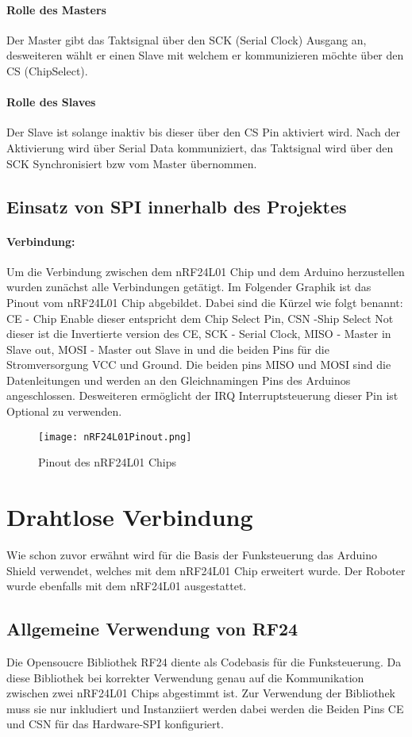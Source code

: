 \documentclass[12pt]{article}
\begin{document}
\paragraph{Rolle des Masters}
Der Master gibt das Taktsignal über den SCK (Serial Clock) Ausgang an, desweiteren wählt er einen Slave mit welchem er kommunizieren möchte über den CS (ChipSelect).
\paragraph{Rolle des Slaves}
Der Slave ist solange inaktiv bis dieser über den CS Pin aktiviert wird. Nach der Aktivierung wird über Serial Data kommuniziert, das Taktsignal wird über den SCK Synchronisiert bzw vom Master übernommen. 

\subsection{Einsatz von SPI innerhalb des Projektes}
\paragraph{Verbindung: }
Um die Verbindung zwischen dem nRF24L01 Chip und dem Arduino herzustellen  wurden zunächst alle Verbindungen getätigt. Im Folgender Graphik ist das Pinout vom nRF24L01 Chip abgebildet. Dabei sind die Kürzel wie folgt benannt: CE - Chip Enable dieser entspricht dem Chip Select Pin, CSN -Ship Select Not dieser ist die Invertierte version des CE, SCK - Serial Clock, MISO - Master in Slave out, MOSI - Master out Slave in und die beiden Pins für die Stromversorgung VCC und Ground. Die beiden pins MISO und MOSI sind die Datenleitungen und werden an den Gleichnamingen Pins des Arduinos angeschlossen. Desweiteren ermöglicht der IRQ Interruptsteuerung dieser Pin ist Optional zu verwenden.
\begin{figure}[h]
	\texttt{[image: nRF24L01Pinout.png]}
	\centering
	\caption{Pinout des nRF24L01 Chips \cite{nRF24Pinout}}
\end{figure}

\newpage
\section{Drahtlose Verbindung} %
    Wie schon zuvor erwähnt wird für die Basis der Funksteuerung das Arduino Shield verwendet, welches mit dem nRF24L01 Chip erweitert wurde. Der Roboter wurde ebenfalls mit dem nRF24L01 ausgestattet.
    \subsection{Allgemeine Verwendung von RF24} %
       Die Opensoucre Bibliothek RF24 \cite{RF24Lib} diente als Codebasis für die Funksteuerung. Da diese Bibliothek bei korrekter Verwendung genau auf die Kommunikation zwischen zwei nRF24L01 Chips abgestimmt ist.
       Zur Verwendung der Bibliothek muss sie nur inkludiert und Instanziiert werden dabei werden die Beiden Pins CE und CSN für das Hardware-SPI konfiguriert.
       
\end{document}
